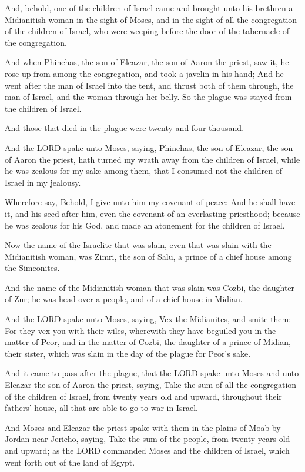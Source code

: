 \Verse And, behold, one of the children of Israel came and brought unto
his brethren a Midianitish woman in the sight of Moses, and in the
sight of all the congregation of the children of Israel, who were
weeping before the door of the tabernacle of the congregation.

\Verse And when Phinehas, the son of Eleazar, the son of Aaron the
priest, saw it, he rose up from among the congregation, and took a
javelin in his hand; \Verse And he went after the man of Israel into the
tent, and thrust both of them through, the man of Israel, and the
woman through her belly. So the plague was stayed from the children of
Israel.

\Verse And those that died in the plague were twenty and four thousand.

\Verse And the LORD spake unto Moses, saying, \Verse Phinehas, the son
of Eleazar, the son of Aaron the priest, hath turned my wrath away
from the children of Israel, while he was zealous for my sake among
them, that I consumed not the children of Israel in my jealousy.

\Verse Wherefore say, Behold, I give unto him my covenant of peace:
\Verse And he shall have it, and his seed after him, even the covenant
of an everlasting priesthood; because he was zealous for his God, and
made an atonement for the children of Israel.

\Verse Now the name of the Israelite that was slain, even that was
slain with the Midianitish woman, was Zimri, the son of Salu, a prince
of a chief house among the Simeonites.

\Verse And the name of the Midianitish woman that was slain was Cozbi,
the daughter of Zur; he was head over a people, and of a chief house
in Midian.

\Verse And the LORD spake unto Moses, saying, \Verse Vex the Midianites,
and smite them: \Verse For they vex you with their wiles, wherewith
they have beguiled you in the matter of Peor, and in the matter of
Cozbi, the daughter of a prince of Midian, their sister, which was
slain in the day of the plague for Peor's sake.


\Chapter
\Verse And it came to pass after the plague, that the LORD spake unto
Moses and unto Eleazar the son of Aaron the priest, saying, \Verse Take
the sum of all the congregation of the children of Israel, from twenty
years old and upward, throughout their fathers' house, all that are
able to go to war in Israel.

\Verse And Moses and Eleazar the priest spake with them in the plains of
Moab by Jordan near Jericho, saying, \Verse Take the sum of the people,
from twenty years old and upward; as the LORD commanded Moses and the
children of Israel, which went forth out of the land of Egypt.

